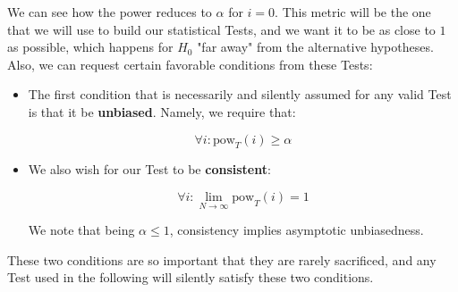 We can see how the power reduces to $\alpha$ for $i=0$. This metric will be the one that we will use to build our statistical Tests, and we want it to be as close to $1$ as possible, which happens for $H_0$ "far away" from the alternative hypotheses. Also, we can request certain favorable conditions from these Tests:


\begin{itemize}
\item
The first condition that is necessarily and silently assumed for any valid Test is that it be \textbf{unbiased}. Namely, we require that:

	\[
	\forall i: \text{pow}_T(i) \geq \alpha
	\tag{Unbiasedness condition}
	\]

\item
We also wish for our Test to be \textbf{consistent}:

	\[
	\forall i: \lim_{N \to \infty}\text{pow}_T(i) = 1
	\tag{Consistency condition}
	\]

We note that being $\alpha\leq1$, consistency implies asymptotic unbiasedness. 
\end{itemize}

These two conditions are so important that they are rarely sacrificed, and any Test used in the following will silently satisfy these two conditions.

